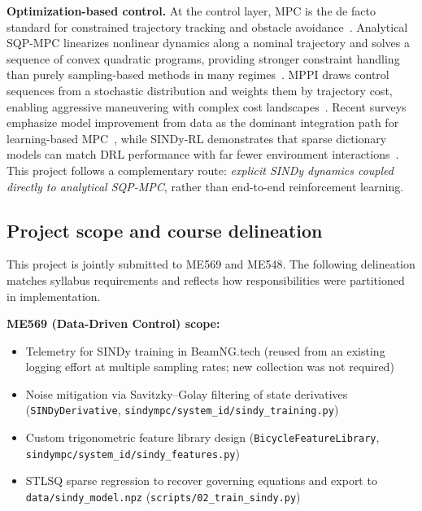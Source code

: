 \documentclass[letterpaper, 10 pt, conference]{ieeeconf}  %
\begin{document}
\textbf{Optimization-based control.}
At the control layer, MPC is the de facto standard for constrained trajectory tracking and obstacle avoidance~\cite{Sani2021,Ismael2024,Lindqvist2020}.
Analytical SQP-MPC linearizes nonlinear dynamics along a nominal trajectory and solves a sequence of convex quadratic programs, providing stronger constraint handling than purely sampling-based methods in many regimes~\cite{Menegatti2025,Nurbayeva2023}.
MPPI draws control sequences from a stochastic distribution and weights them by trajectory cost, enabling aggressive maneuvering with complex cost landscapes~\cite{Williams2016MPPI,Williams2017MPPI}.
Recent surveys emphasize model improvement from data as the dominant integration path for learning-based MPC~\cite{Hewing2020}, while SINDy-RL demonstrates that sparse dictionary models can match DRL performance with far fewer environment interactions~\cite{Zolman2025}.
This project follows a complementary route: \emph{explicit SINDy dynamics coupled directly to analytical SQP-MPC}, rather than end-to-end reinforcement learning.

\subsection{Project scope and course delineation}

This project is jointly submitted to ME569 and ME548.
The following delineation matches syllabus requirements and reflects how responsibilities were partitioned in implementation.

\textbf{ME569 (Data-Driven Control) scope:}
\begin{itemize}
  \item Telemetry for SINDy training in BeamNG.tech (reused from an existing logging effort at multiple sampling rates; new collection was not required)
  \item Noise mitigation via Savitzky--Golay filtering of state derivatives (\texttt{SINDyDerivative}, \texttt{sindympc/system\_id/sindy\_training.py})
  \item Custom trigonometric feature library design (\texttt{BicycleFeatureLibrary}, \texttt{sindympc/system\_id/sindy\_features.py})
  \item STLSQ sparse regression to recover governing equations and export to \texttt{data/sindy\_model.npz} (\texttt{scripts/02\_train\_sindy.py})
\end{itemize}
\end{document}
